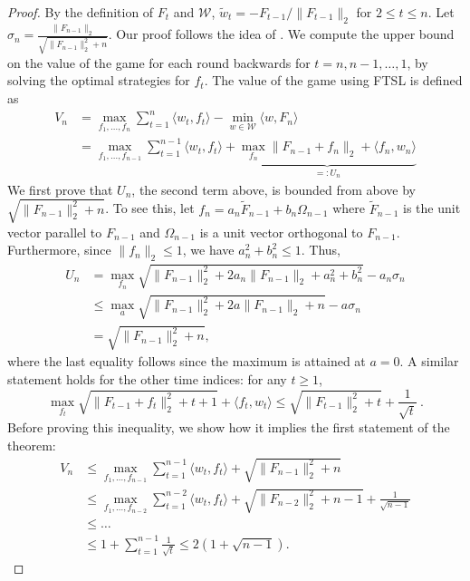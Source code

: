 \documentclass[english]{article}
\newcommand{\cW}{\mathcal{W}}
\newcommand{\inpro}[2]{\langle #1, #2\rangle}
\begin{document}
\begin{proof}
	By the definition of $F_t$ and $\cW$, $\tilde{w}_{t} =- F_{t-1}/\|F_{t-1}\|_2$ for $2\le t\le n$.
	Let $\sigma_n = \frac{\|F_{n-1}\|_2}{\sqrt{\|F_{n-1}\|_2^2 + n}}$.
	Our proof follows the idea of \citet{abernethy2008optimal}. We compute the upper bound on the value of the game for each round backwards for $t=n,n-1,\dots,1$, by solving the optimal strategies for $f_t$.
	The value of the game using FTSL is defined as
	\begin{align*}
	V_n & = \max_{f_1, \ldots, f_n} \sum_{t=1}^{n}\inpro{w_t}{f_t}- \min_{w\in\cW} \inpro{w}{F_n} \\
	& = \max_{f_1,\ldots, f_{n-1}} \sum_{t=1}^{n-1}\inpro{w_t}{f_t} + \underbrace{\max_{f_n} \|F_{n-1}+f_n\|_2 + \inpro{f_n}{w_n}}_{=:U_n}
	\end{align*}
We first prove that $U_n$, the second term above, is bounded from above by  $\sqrt{\|F_{n-1}\|_2^2 + n}$. To see this, let $f_n = a_n \tilde{F}_{n-1} + b_n \Omega_{n-1}$ where $\tilde{F}_{n-1}$ is the unit vector parallel to $F_{n-1}$ and $\Omega_{n-1}$ is a unit vector orthogonal to $F_{n-1}$.  Furthermore, since $\|f_n\|_2 \le 1$, we have $a_n^2+b_n^2 \le 1$.
Thus,
\begin{align*}
U_n & = \max_{f_n} \sqrt{\|F_{n-1}\|_2^2 + 2a_n\|F_{n-1}\|_2 + a_n^2 + b_n^2} - a_n\sigma_{n}\\
 & \le \max_{a} \sqrt{\|F_{n-1}\|_2^2 + 2a\|F_{n-1}\|_2 + n} - a\sigma_{n}\\
 & = \sqrt{\|F_{n-1}\|_2^2 + n},
\end{align*}  
where the last equality follows since the maximum is attained at $a=0$. 
A similar statement holds for the other time indices: for any $t \ge 1$,
\begin{equation}
\label{eq:stepDiff1}
\max_{f_t} \sqrt{\|F_{t-1} + f_t\|_2^2 + t + 1} + \inpro{f_t}{w_t} \le  \sqrt{\|F_{t-1}\|_2^2 + t} + \frac{1}{\sqrt{t}}~.
\end{equation}
Before proving this inequality, we show how it implies the first statement of the theorem:
\begin{align*}
V_n & \le \max_{f_1,\ldots, f_{n-1}} \sum_{t=1}^{n-1}\inpro{w_t}{f_t} + \sqrt{\|F_{n-1}\|_2^2 + n} \\
& \le \max_{f_1,\ldots, f_{n-2}} \sum_{t=1}^{n-2}\inpro{w_t}{f_t}  + \sqrt{\|F_{n-2}\|_2^2 + n-1} + \frac{1}{\sqrt{n-1}} \\
& \le \ldots \\
& \le 1+ \sum_{t=1}^{n-1}\frac{1}{\sqrt{t}} \le 2(1+\sqrt{n-1}).
\end{align*}

\end{proof}
\end{document}
